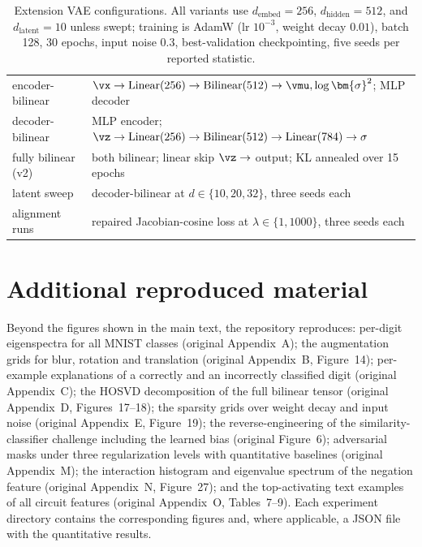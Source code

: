 \documentclass[10pt]{article} %
\def\vsigma{{\bm{\sigma}}} %
\begin{document}
\begin{table}[H]
\begin{center}
\begin{tabular}{ll}
\toprule
encoder-bilinear & $\vx \to \text{Linear}(256) \to \text{Bilinear}(512) \to \vmu, \log\vsigma^2$; MLP decoder \\
decoder-bilinear & MLP encoder; $\vz \to \text{Linear}(256) \to \text{Bilinear}(512) \to \text{Linear}(784) \to \sigma$ \\
fully bilinear (v2) & both bilinear; linear skip $\vz \to$ output; KL annealed over 15 epochs \\
latent sweep & decoder-bilinear at $d \in \{10, 20, 32\}$, three seeds each \\
alignment runs & repaired Jacobian-cosine loss at $\lambda \in \{1, 1000\}$, three seeds each \\
\bottomrule
\end{tabular}
\end{center}
\caption{Extension VAE configurations. All variants use $d_{\text{embed}} = 256$,
$d_{\text{hidden}} = 512$, and $d_{\text{latent}} = 10$ unless swept; training is
AdamW (lr $10^{-3}$, weight decay $0.01$), batch 128, 30 epochs, input noise 0.3,
best-validation checkpointing, five seeds per reported statistic.}
\end{table}

\section{Additional reproduced material}
\label{app:extra}

Beyond the figures shown in the main text, the repository reproduces: per-digit
eigenspectra for all MNIST classes (original Appendix~A); the augmentation grids for
blur, rotation and translation (original Appendix~B, Figure~14); per-example
explanations of a correctly and an incorrectly classified digit (original
Appendix~C); the HOSVD decomposition of the full bilinear tensor (original
Appendix~D, Figures~17--18); the sparsity grids over weight decay and input noise
(original Appendix~E, Figure~19); the reverse-engineering of the
similarity-classifier challenge including the learned bias (original Figure~6);
adversarial masks under three regularization levels with quantitative baselines
(original Appendix~M); the interaction histogram and eigenvalue spectrum of the
negation feature (original Appendix~N, Figure~27); and the top-activating text
examples of all circuit features (original Appendix~O, Tables~7--9). Each experiment
directory contains the corresponding figures and, where applicable, a JSON file with
the quantitative results.
\end{document}
